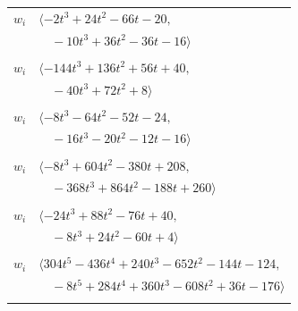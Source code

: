 \documentclass[11pt]{article}
\begin{document}
\begin{longtable}{@{}ll@{}}
$w_i$ & $\langle -2t^{3}+24t^{2}-66t-20,$\\
 & $\quad -10t^{3}+36t^{2}-36t-16\rangle$\\
\addlinespace[2pt]
\multicolumn{2}{@{}p{0.97\textwidth}@{}}{$i=42$, $D_i=4$, $\rho_{ij}$: $0{:}1, \allowbreak 2{:}2, \allowbreak 3{:}2, \allowbreak 9{:}2, \allowbreak 58{:}1, \allowbreak 63{:}1$}\\
$w_i$ & $\langle -144t^{3}+136t^{2}+56t+40,$\\
 & $\quad -40t^{3}+72t^{2}+8\rangle$\\
\addlinespace[2pt]
\multicolumn{2}{@{}p{0.97\textwidth}@{}}{$i=43$, $D_i=4$, $\rho_{ij}$: $0{:}1, \allowbreak 1{:}1, \allowbreak 33{:}1, \allowbreak 44{:}1, \allowbreak 46{:}2, \allowbreak 47{:}2, \allowbreak 56{:}1$}\\
$w_i$ & $\langle -8t^{3}-64t^{2}-52t-24,$\\
 & $\quad -16t^{3}-20t^{2}-12t-16\rangle$\\
\addlinespace[2pt]
\multicolumn{2}{@{}p{0.97\textwidth}@{}}{$i=44$, $D_i=4$, $\rho_{ij}$: $5{:}2, \allowbreak 8{:}2, \allowbreak 10{:}1, \allowbreak 12{:}1, \allowbreak 23{:}1, \allowbreak 31{:}2, \allowbreak 43{:}2, \allowbreak 46{:}2, \allowbreak 50{:}1, \allowbreak 56{:}1, \allowbreak 59{:}1$}\\
$w_i$ & $\langle -8t^{3}+604t^{2}-380t+208,$\\
 & $\quad -368t^{3}+864t^{2}-188t+260\rangle$\\
\addlinespace[2pt]
\multicolumn{2}{@{}p{0.97\textwidth}@{}}{$i=45$, $D_i=4$, $\rho_{ij}$: $5{:}1, \allowbreak 8{:}1, \allowbreak 10{:}2, \allowbreak 14{:}2, \allowbreak 28{:}1, \allowbreak 49{:}2$}\\
$w_i$ & $\langle -24t^{3}+88t^{2}-76t+40,$\\
 & $\quad -8t^{3}+24t^{2}-60t+4\rangle$\\
\addlinespace[2pt]
\multicolumn{2}{@{}p{0.97\textwidth}@{}}{$i=46$, $D_i=4$, $\rho_{ij}$: $0{:}2, \allowbreak 1{:}1, \allowbreak 7{:}1, \allowbreak 10{:}2, \allowbreak 18{:}1, \allowbreak 19{:}2, \allowbreak 30{:}2, \allowbreak 34{:}2, \allowbreak 43{:}1, \allowbreak 44{:}1, \allowbreak 51{:}2, \allowbreak 54{:}2$}\\
$w_i$ & $\langle 304t^{5}-436t^{4}+240t^{3}-652t^{2}-144t-124,$\\
 & $\quad -8t^{5}+284t^{4}+360t^{3}-608t^{2}+36t-176\rangle$\\
\addlinespace[2pt]
\multicolumn{2}{@{}p{0.97\textwidth}@{}}{$i=47$, $D_i=4$, $\rho_{ij}$: $0{:}2, \allowbreak 23{:}2, \allowbreak 26{:}1, \allowbreak 32{:}2, \allowbreak 43{:}1, \allowbreak 50{:}1, \allowbreak 58{:}2, \allowbreak 61{:}1, \allowbreak 62{:}2, \allowbreak 63{:}2$}\\

\end{longtable}
\end{document}
